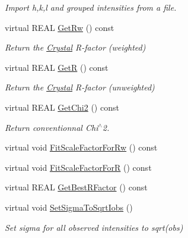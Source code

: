 \begin{DoxyCompactItemize}
\begin{DoxyCompactList}\small\item\em Import h,k,l and grouped intensities from a file. \end{DoxyCompactList}\item 
virtual R\+E\+AL \mbox{\hyperlink{class_obj_cryst_1_1_diffraction_data_single_crystal_a7eb4bb7f2c42ba1be86010c666d11b97}{Get\+Rw}} () const
\begin{DoxyCompactList}\small\item\em Return the \mbox{\hyperlink{class_obj_cryst_1_1_crystal}{Crystal}} R-\/factor (weighted) \end{DoxyCompactList}\item 
virtual R\+E\+AL \mbox{\hyperlink{class_obj_cryst_1_1_diffraction_data_single_crystal_add61e41d60f231d38bcdf9244339ab78}{GetR}} () const
\begin{DoxyCompactList}\small\item\em Return the \mbox{\hyperlink{class_obj_cryst_1_1_crystal}{Crystal}} R-\/factor (unweighted) \end{DoxyCompactList}\item 
virtual R\+E\+AL \mbox{\hyperlink{class_obj_cryst_1_1_diffraction_data_single_crystal_a6525600072e31324bdcb1219f33198cb}{Get\+Chi2}} () const
\begin{DoxyCompactList}\small\item\em Return conventionnal Chi$^\wedge$2. \end{DoxyCompactList}\item 
virtual void \mbox{\hyperlink{class_obj_cryst_1_1_diffraction_data_single_crystal_a435fc2d77a7ec7c948214eacb8ce8f3b}{Fit\+Scale\+Factor\+For\+Rw}} () const
\item 
virtual void \mbox{\hyperlink{class_obj_cryst_1_1_diffraction_data_single_crystal_a64a07606d4f21cc2d6389161bebc8645}{Fit\+Scale\+Factor\+ForR}} () const
\item 
virtual R\+E\+AL \mbox{\hyperlink{class_obj_cryst_1_1_diffraction_data_single_crystal_a48bf1e9a133db940e2de70a446765914}{Get\+Best\+R\+Factor}} () const
\item 
virtual void \mbox{\hyperlink{class_obj_cryst_1_1_diffraction_data_single_crystal_a68395af92ab6a91a6ecc6e7633495b75}{Set\+Sigma\+To\+Sqrt\+Iobs}} ()
\begin{DoxyCompactList}\small\item\em Set sigma for all observed intensities to sqrt(obs) \end{DoxyCompactList}\item 

\end{DoxyCompactItemize}
